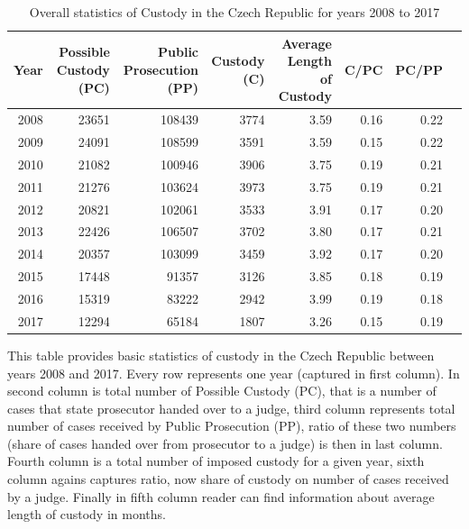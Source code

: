 \documentclass[12pt, twoside]{book} %
\begin{document}
\newpage

\begin{table}
\centering
\begin{tabular}{rrrrrrrr}
  \hline
 Year & Possible Custody (PC) & Public Prosecution (PP) & Custody (C) & Average Length of Custody & C/PC & PC/PP \\ 
  \hline
 2008 & 23651 & 108439 & 3774 & 3.59 & 0.16 & 0.22 \\ 
   2009 & 24091 & 108599 & 3591 & 3.59 & 0.15 & 0.22 \\ 
   2010 & 21082 & 100946 & 3906 & 3.75 & 0.19 & 0.21 \\ 
   2011 & 21276 & 103624 & 3973 & 3.75 & 0.19 & 0.21 \\ 
  2012 & 20821 & 102061 & 3533 & 3.91 & 0.17 & 0.20 \\ 
   2013 & 22426 & 106507 & 3702 & 3.80 & 0.17 & 0.21 \\ 
   2014 & 20357 & 103099 & 3459 & 3.92 & 0.17 & 0.20 \\ 
   2015 & 17448 & 91357 & 3126 & 3.85 & 0.18 & 0.19 \\ 
  2016 & 15319 & 83222 & 2942 & 3.99 & 0.19 & 0.18 \\ 
   2017 & 12294 & 65184 & 1807 & 3.26 & 0.15 & 0.19 \\ 
   \hline
\end{tabular}
  \caption{Overall statistics of Custody in the Czech Republic for years 2008 to 2017 }

 \medskip
{\small This table provides basic statistics of custody in the Czech Republic between years 2008 and 2017. Every row represents one year (captured in first column). In second column is total number of Possible Custody (PC), that is a number of cases that state prosecutor handed over to a judge, third column represents total number of cases received by Public Prosecution (PP), ratio of these two numbers (share of cases handed over from prosecutor to a judge) is then in last column. Fourth column is a total number of imposed custody for a given year, sixth column agains captures ratio, now share of custody on number of cases received by a judge. Finally in fifth column reader can find information about average length of custody in months.}
\end{table}
\end{document}
